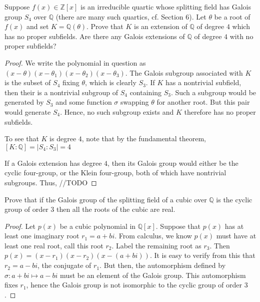 \documentclass[10pt]{article}
\newcommand{\Z}{\mathbb{Z}}
\newcommand{\Q}{\mathbb{Q}}
\newenvironment{problem}[2][Problem]{\begin{trivlist}
		\item[\hskip \labelsep {\bfseries #1}\hskip \labelsep {\bfseries #2.}]}{\end{trivlist}}
\begin{document}
	\begin{problem}{2.11}
		Suppose $f(x) \in \Z[x]$ is an irreducible quartic whose splitting field has Galois group $S_4$ over $\Q$ (there are many such quartics, cf. Section 6). Let $\theta$ be a root of $f(x)$ and set $K = \Q(\theta)$. Prove that $K$ is an extension of $\Q$ of degree $4$ which has no proper subfields. Are there any Galois extensions of $\Q$ of degree $4$ with no proper subfields?
		\begin{proof}
			We write the polynomial in question as $(x - \theta)(x - \theta_1)(x - \theta_2)(x - \theta_3)$. The Galois subgroup associated with $K$ is the subset of $S_4$ fixing $\theta$, which is clearly $S_3$. If $K$ has a nontrivial subfield, then their is a nontrivial subgroup of $S_4$ containing $S_3$. Such a subgroup would be generated by $S_3$ and some function $\sigma$ swapping $\theta$ for another root. But this pair would generate $S_4$. Hence, no such subgroup exists and $K$ therefore has no proper subfields.
			
			To see that $K$ is degree $4$, note that by the fundamental theorem, $[K:\Q] = |S_4:S_3| = 4$
			
			If a Galois extension has degree $4$, then its Galois group would either be the cyclic four-group, or the Klein four-group, both of which have nontrivial subgroups. Thus, //TODO
		\end{proof}
	\end{problem}
	
	\begin{problem}{2.13}
		Prove that if the Galois group of the splitting field of a cubic over $\Q$ is the cyclic group of order $3$ then all the roots of the cubic are real.
		\begin{proof}
			Let $p(x)$ be a cubic polynomial in $\Q[x]$. Suppose that $p(x)$ has at least one imaginary root $r_1=a+bi$. From calculus, we know $p(x)$ must have at least one real root, call this root $r_2$. Label the remaining root as $r_3$. Then $p(x) = (x-r_1)(x-r_2)(x-(a+bi))$. It is easy to verify from this that $r_2 = a-bi$, the conjugate of $r_1$. But then, the automorphism defined by $\sigma: a+bi \mapsto a-bi$ must be an element of the Galois group. This automorphism fixes $r_1$, hence the Galois group is not isomorphic to the cyclic group of order $3$.
		\end{proof}
	\end{problem}
	
\end{document}
